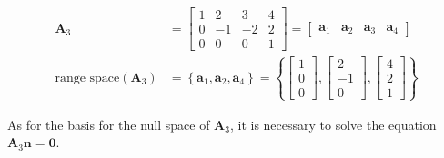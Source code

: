 \begin{itemize}
\begin{align*}
\mathbf{A}_3 &= \begin{bmatrix}
                    1 & 2 & 3 & 4\\
                    0 & -1 & -2 & 2\\
                    0 & 0 & 0 & 1
                \end{bmatrix}
            =   \begin{bmatrix}
                    \mathbf{a}_1 &
                    \mathbf{a}_2 &
                    \mathbf{a}_3 &
                    \mathbf{a}_4
                \end{bmatrix} \\
\text{range space}(\mathbf{A}_3) &=
 \left \{ \mathbf{a}_1 , \mathbf{a}_2 , \mathbf{a}_4 \right \}
    =
    \left \{
    \begin{bmatrix} 1 \\  0  \\ 0  \end{bmatrix},
    \begin{bmatrix} 2\\   -1\\ 0  \end{bmatrix},
    \begin{bmatrix}  4\\  2 \\  1 \end{bmatrix}
    \right \}
\end{align*}


As for the basis for the null space of $\mathbf{A}_3$,
it is necessary to solve the equation
$\mathbf{A}_3 \mathbf{n} = \mathbf{0}$.


\end{itemize}
